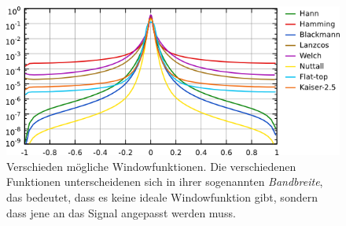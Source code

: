 \begin{figure}
\includegraphics[width=12cm]{pics/windowing-fft}
\caption{Verschieden mögliche Windowfunktionen\cite{gwyddion}.
Die verschiedenen Funktionen unterscheidenen sich in ihrer
sogenannten \textit{Bandbreite}, das bedeutet, dass es keine
ideale Windowfunktion gibt, sondern dass jene an das Signal
angepasst werden muss. } 
\label{fig:windowing-fft}
\end{figure}

